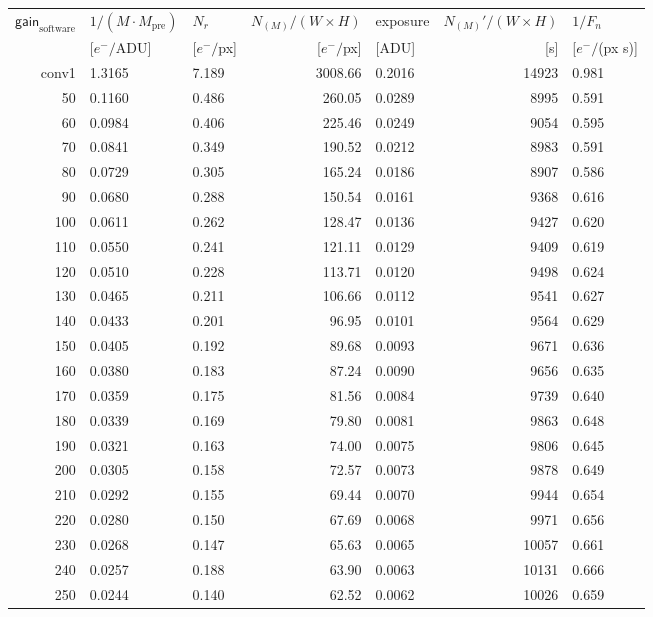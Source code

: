 \begin{table}[!htbp]
  \centering
  \begin{tabular}{r l l r  l r l}
\toprule
$\textsf{gain}_\textrm{software}$ & $1/(M\cdot M_\textrm{pre})$ & $N_r$ & $N_{(M)}/(W\times H)$ &  \textsf{exposure} & $N_{(M)}'/(W\times H)$ & $1/F_n$ \\
 & [$e^-/$ADU] & [$e^-/$px] & [$e^-/$px] & [ADU] & [s] & [$e^-/$(px s)]  \\
\midrule
conv1 & 1.3165 & 7.189 & 3008.66      & 0.2016 & 14923 & 0.981 \\
50 & 0.1160 & 0.486 & 260.05 & 0.0289 & 8995 & 0.591 \\
60 & 0.0984 & 0.406 & 225.46 & 0.0249 & 9054 & 0.595 \\
70 & 0.0841 & 0.349 & 190.52 & 0.0212 & 8983 & 0.591 \\
80 & 0.0729 & 0.305 & 165.24 & 0.0186 & 8907 & 0.586 \\
90 & 0.0680 & 0.288 & 150.54 & 0.0161 & 9368 & 0.616 \\
100 & 0.0611 & 0.262 & 128.47 & 0.0136 & 9427 & 0.620 \\
110 & 0.0550 & 0.241 & 121.11 & 0.0129 & 9409 & 0.619 \\
120 & 0.0510 & 0.228 & 113.71 & 0.0120 & 9498 & 0.624 \\
130 & 0.0465 & 0.211 & 106.66 & 0.0112 & 9541 & 0.627 \\
140 & 0.0433 & 0.201 & 96.95 & 0.0101 & 9564 & 0.629 \\
150 & 0.0405 & 0.192 & 89.68 & 0.0093 & 9671 & 0.636 \\
160 & 0.0380 & 0.183 & 87.24 & 0.0090 & 9656 & 0.635 \\
170 & 0.0359 & 0.175 & 81.56 & 0.0084 & 9739 & 0.640 \\
180 & 0.0339 & 0.169 & 79.80 & 0.0081 & 9863 & 0.648 \\
190 & 0.0321 & 0.163 & 74.00 & 0.0075 & 9806 & 0.645 \\
200 & 0.0305 & 0.158 & 72.57 & 0.0073 & 9878 & 0.649 \\
210 & 0.0292 & 0.155 & 69.44 & 0.0070 & 9944 & 0.654 \\
220 & 0.0280 & 0.150 & 67.69 & 0.0068 & 9971 & 0.656 \\
230 & 0.0268 & 0.147 & 65.63 & 0.0065 & 10057 & 0.661 \\
240 & 0.0257 & 0.188 & 63.90 & 0.0063 & 10131 & 0.666 \\
250 & 0.0244 & 0.140 & 62.52 & 0.0062 & 10026 & 0.659 \\

\end{tabular}
\end{table}

